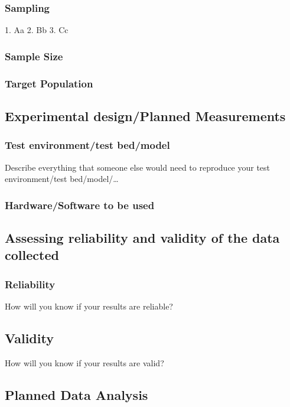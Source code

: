 \documentclass[a4paper,10pt,twocolumn]{article}
\numberwithin{figure}{section}
\numberwithin{table}{section}
\begin{document}
\subsubsection{Sampling}
1. Aa
2. Bb
3. Cc

\subsubsection{Sample Size}

\subsubsection{Target Population}


\subsection{Experimental design/Planned Measurements}


\subsubsection{Test environment/test bed/model}
Describe everything that someone else would need to reproduce your test environment/test
bed/model/…

\subsubsection{Hardware/Software to be used}


\subsection{Assessing reliability and validity of the data collected}

\subsubsection{Reliability}
How will you know if your results are reliable?

\subsection{Validity}
How will you know if your results are valid?



\subsection{Planned Data Analysis}
\end{document}
